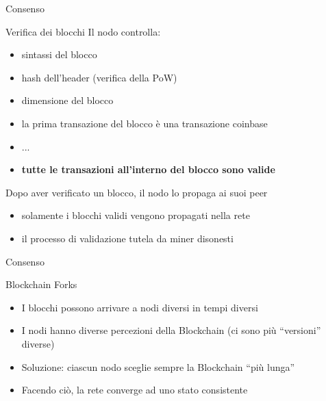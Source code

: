 \documentclass{beamer}
\begin{document}
  
  \begin{frame}{Consenso}
      \begin{block}{Verifica dei blocchi}
      Il nodo controlla:
        \begin{itemize}
            \item sintassi del blocco
            \item hash dell'header (verifica della PoW)
            \item dimensione del blocco 
            \item la prima transazione del blocco è una transazione coinbase
            \item ...
            \item \textbf{tutte le transazioni all'interno del blocco sono valide}
        \end{itemize}
      \end{block}
      Dopo aver verificato un blocco, il nodo lo propaga ai suoi peer
      \begin{itemize}
          \item [\MVRightarrow] solamente i blocchi validi vengono propagati nella rete
          \item [\MVRightarrow] il processo di validazione tutela da miner disonesti %
      \end{itemize}
  \end{frame}
  
  
  
  \begin{frame}{Consenso}
      \begin{block}{Blockchain Forks}
        \begin{itemize}
            \item I blocchi possono arrivare a nodi diversi in tempi diversi
            \item I nodi hanno diverse percezioni della Blockchain (ci sono più ``versioni'' diverse) 
            \item Soluzione: ciascun nodo sceglie sempre la Blockchain ``più lunga''  %
            \item Facendo ciò, la rete converge ad uno stato consistente 
        \end{itemize}
      \end{block}
  \end{frame}
  
\end{document}
